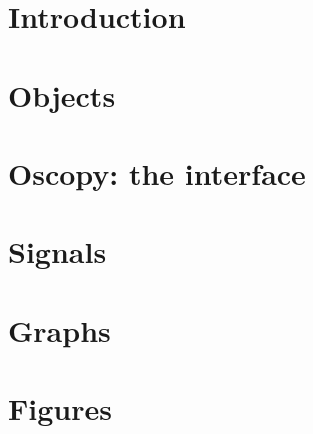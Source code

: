 \documentclass[a4paper,11pt]{article}
\begin{document}
\section{Introduction}
\label{sec:intro}

\section{Objects}
\label{sec:obj}

\section{Oscopy: the interface}
\label{sec:itf}

\section{Signals}
\label{sec:sigs}

\section{Graphs}
\label{sec:graphs}

\section{Figures}
\label{sec:figs}
\end{document}
